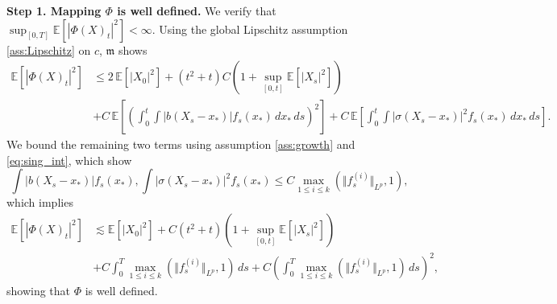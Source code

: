 \documentclass[10pt,oneside]{amsart}
\numberwithin{equation}{section}
\numberwithin{definition}{section}
\numberwithin{theorem}{section}
\numberwithin{lemma}{section}
\begin{document}
\textbf{Step 1. Mapping $\Phi$ is well defined.} We verify that $\sup_{[0,T]}\mathbb{E}\left[\left|\Phi(X)_{t}\right|^{2}\right]<\infty$. Using the global Lipschitz assumption \ref{ass:Lipschitz} on $c$, $\mathfrak m$ shows
%
\begin{align*}
  \mathbb{E}\left[\left|\Phi(X)_{t}\right|^{2}\right] &
  \leq2\,\mathbb{E}\left[|X_{0}|^{2}\right] + (t^{2}+t)C\left(1+\sup_{[0,t]}\mathbb{E}\left[|X_{s}|^{2}\right]\right) 	\\
  & +C\,\mathbb{E}\left[\left(\int_{0}^{t}\int\left|b(X_{s}-x_{*})\right|f_{s}(x_{*})\,dx_{*}\,ds\right)^{2}\right]
  +C\,\mathbb{E}\left[\int_{0}^{t}\int|\sigma(X_{s}-x_{*})|^{2}f_{s}(x_{*})\,dx_{*}\,ds\right].
\end{align*}
%
We bound the remaining two terms using assumption \ref{ass:growth} and \cref{eq:sing_int}, which show
%
\begin{equation*}
  \int\left|b(X_{s}-x_{*})\right|f_{s}(x_{*}),\int|\sigma(X_{s}-x_{*})|^{2}f_{s}(x_{*})\leq C\max_{1\leq i\leq k}(\Vert f_{s}^{(i)}\Vert_{L^p},1),
\end{equation*}
%
which implies
%
\begin{align*}
  \mathbb{E}\left[\left|\Phi(X)_{t}\right|^{2}\right]&
  \lesssim\mathbb{E}\left[|X_{0}|^{2}\right]+
  C(t^{2}+t)\left(1+\sup_{[0,t]}\mathbb{E}\left[|X_{s}|^{2}\right]\right)\\&+C\int_{0}^{T}\max_{1\leq i\leq k}(\Vert f_{s}^{(i)}\Vert_{L^p},1)\,ds
  +C\left(\int_{0}^{T}\max_{1\leq i\leq k}(\Vert f_{s}^{(i)}\Vert_{L^p},1)\,ds\right)^{2},
\end{align*}
%
showing that $\Phi$ is well defined.
\end{document}
